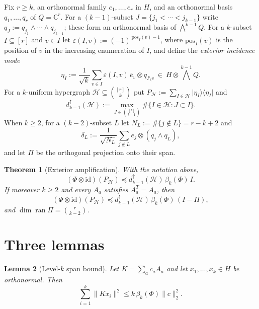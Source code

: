 \documentclass[11pt,reqno]{amsart}
\theoremstyle{plain}
\newtheorem{theorem}{Theorem}[section]
\newtheorem{lemma}[theorem]{Lemma}
\theoremstyle{remark}
\newcommand{\id}{\mathrm{id}}
\newcommand{\ketbra}[2]{\lvert #1\rangle\!\langle #2\rvert}
\newcommand{\norm}[1]{\lVert #1\rVert}
\newcommand{\C}{\mathbb C}
\begin{document}
Fix $r\ge k$, an orthonormal family $e_1,\ldots,e_r$ in $H$, and an orthonormal
basis $q_1,\ldots,q_r$ of $Q=\C^r$.  For a $(k-1)$-subset
$J=\{j_1<\cdots<j_{k-1}\}$ write $q_J:=q_{j_1}\wedge\cdots\wedge q_{j_{k-1}}$;
these form an orthonormal basis of $\bigwedge^{k-1}Q$.  For a $k$-subset
$I\subseteq[r]$ and $v\in I$ let $\varepsilon(I,v):=(-1)^{\,\mathrm{pos}_I(v)-1}$,
where $\mathrm{pos}_I(v)$ is the position of $v$ in the increasing enumeration
of $I$, and define the \emph{exterior incidence mode}
\begin{equation}
\label{eq:eta}
    \eta_I
    :=
    \frac1{\sqrt k}\sum_{v\in I}\varepsilon(I,v)\,
    \overline e_v\otimes q_{I\setminus v}
    \ \in\ H\otimes\textstyle\bigwedge^{k-1}Q .
\end{equation}
For a $k$-uniform hypergraph $\mathcal H\subseteq\binom{[r]}k$ put
$P_{\mathcal H}:=\sum_{I\in\mathcal H}\ketbra{\eta_I}{\eta_I}$ and
\begin{equation}
\label{eq:updeg}
    d^\uparrow_{k-1}(\mathcal H)
    :=\max_{J\in\binom{[r]}{k-1}}\#\{I\in\mathcal H:J\subset I\} .
\end{equation}
When $k\ge2$, for a $(k-2)$-subset $L$ let
$N_L:=\#\{j\notin L\}=r-k+2$ and
\begin{equation}
\label{eq:delta}
    \delta_L:=\frac1{\sqrt{N_L}}\sum_{j\notin L}e_j\otimes(q_j\wedge q_L),
\end{equation}
and let $\Pi$ be the orthogonal projection onto their span.

\begin{theorem}[Exterior amplification]
\label{thm:main}
With the notation above,
\begin{equation}
\label{eq:A0}
    (\Phi\otimes\id)(P_{\mathcal H})
    \preceq
    d^\uparrow_{k-1}(\mathcal H)\,\beta_k(\Phi)\,I .
\end{equation}
If moreover $k\ge2$ and every $A_a$ satisfies $A_a^T=A_a$, then
\begin{equation}
\label{eq:A}
    (\Phi\otimes\id)(P_{\mathcal H})
    \preceq
    d^\uparrow_{k-1}(\mathcal H)\,\beta_k(\Phi)\,(I-\Pi),
\end{equation}
and $\dim\operatorname{ran}\Pi=\binom r{k-2}$.
\end{theorem}

\section{Three lemmas}

\begin{lemma}[Level-$k$ span bound]
\label{lem:span}
Let $K=\sum_ac_aA_a$ and let $x_1,\ldots,x_k\in H$ be orthonormal.  Then
\[
    \sum_{i=1}^k\norm{Kx_i}^2\le k\,\beta_k(\Phi)\norm c_2^2 .
\]
\end{lemma}
\end{document}
